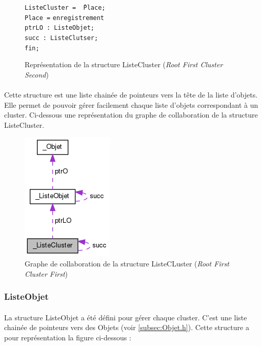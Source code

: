 \documentclass[twoside,UTF8]{EPURapport}
\begin{document}
\begin{figure}[H]

\begin{tabbing}
\texttt{ListeCluster = \^\,Place;} \\
\texttt{Place =} \= \texttt{enregistrement} \\
\> \texttt{ptrLO : ListeObjet;} \\
\> \texttt{succ : ListeClutser;} \\
\> \texttt{fin; } \\
\end{tabbing}

\caption{Représentation de la structure ListeCluster (\textit{Root First Cluster Second})}
\end{figure}

\paragraph{}
Cette structure est une liste chainée de pointeurs vers la tête de la liste d'objets. Elle permet de pouvoir gérer facilement chaque liste d'objets correspondant à un cluster. 
Ci-dessous une représentation du graphe de collaboration de la structure ListeCluster.


\begin{figure}[H]
	\center
	\includegraphics[scale=0.5]{images/struct_listeClusterRF.png}
	\caption{Graphe de collaboration de la structure ListeCLuster (\textit{Root First Cluster First})}
\end{figure} 

\subsubsection{ListeObjet}

\paragraph{}
La structure ListeObjet a été défini pour gérer chaque cluster. C'est une liste chainée de pointeurs vers des Objets (voir \ref{subsec:Objet.h}). Cette structure a pour représentation la figure ci-dessous : 
\end{document}
